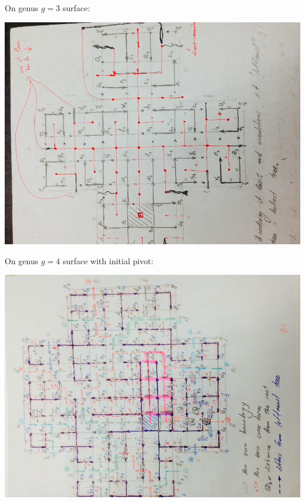 \documentclass{article}
\begin{document}
\newpage
On genus $g = 3$ surface:
\begin{center}
\includegraphics[angle = -90, scale = 0.7]{figures/genus3.jpg}
\end{center}

\newpage
On genus $g = 4$ surface with initial pivot:
\begin{center}
\includegraphics[angle = -90, scale = 0.7]{figures/genus4_initialPivot.jpg}
\end{center}
\end{document}
